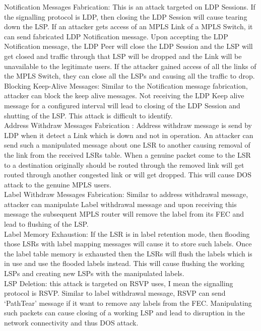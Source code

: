     Notification Messages Fabrication: This is an attack targeted on LDP Sessions. If the signalling protocol is LDP, then closing the LDP Session will cause tearing down the LSP. If an attacker gets access of an MPLS Link of a MPLS Switch, it can send fabricated LDP Notification message. Upon accepting the LDP Notification message, the LDP Peer will close the LDP Session and the LSP will get closed and traffic through that LSP will be dropped and the Link will be unavailable to the legitimate users. If the attacker gained access of all the links of the MPLS Switch, they can close all the LSPs and causing all the traffic to drop\cite{palmieri_fiore_2007}. \\

    Blocking Keep-Alive Messages:  Similar to the Notification message fabrication, attacker can block the keep alive messages. Not receiving the LDP Keep alive message for a configured interval will lead to closing of the LDP Session and shutting of the LSP. This attack is difficult to identify.\\

    Address Withdraw Messages Fabrication : Address withdraw message is send by LDP when it detect a Link which is down and not in operation. An attacker can send such a manipulated message about one LSR to another causing removal of the link from the received LSRs table. When a genuine packet come to the LSR to a destination originally should be routed through the removed link will get routed through another congested link or will get dropped. This will cause DOS attack to the genuine MPLS users.\\ 

    Label Withdraw Messages Fabrication: Similar to address withdrawal message, attacker can manipulate Label withdrawal message and upon receiving this message the subsequent MPLS router will remove the label from its FEC and lead to flushing of the LSP.\\

    Label Memory Exhaustion: If the LSR is in label retention mode, then flooding those LSRs with label mapping messages will cause it to store such labels. Once the label table memory is exhausted then the LSRs will flush the labels which is in use and use the flooded labels instead. This will cause flushing the working LSPs and creating new LSPs with the manipulated labels.\\

    LSP Deletion: this attack is targeted on RSVP uses, I mean the signalling protocol is RSVP. Similar to label withdrawal message, RSVP can send ‘PathTear’ message if it want to remove any labels from the FEC. Manipulating such packets can cause closing of a working LSP and lead to disruption in the network connectivity and thus DOS attack.\\
    
